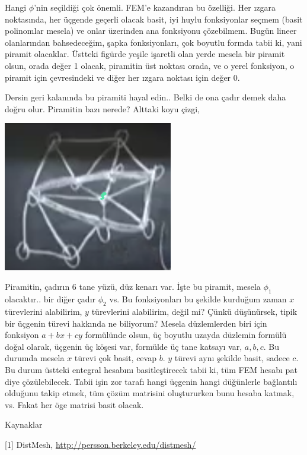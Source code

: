 \documentclass[12pt,fleqn]{article}\usepackage{../../common}
\begin{document}
Hangi $\phi$'nin seçildiği çok önemli. FEM'e kazandıran bu özelliği. Her ızgara
noktasında, her üçgende geçerli olacak basit, iyi huylu fonksiyonlar seçmem
(basit polinomlar mesela) ve onlar üzerinden ana fonksiyonu çözebilmem.  Bugün
lineer olanlarından bahsedeceğim, şapka fonksiyonları, çok boyutlu formda tabii
ki, yani piramit olacaklar. Üstteki figürde yeşile işaretli olan yerde mesela
bir piramit olsun, orada değer 1 olacak, piramitin üst noktası orada, ve o yerel
fonksiyon, o piramit için çevresindeki ve diğer her ızgara noktası için değer 0.

Dersin geri kalanında bu piramiti hayal edin.. Belki de ona çadır demek daha
doğru olur. Piramitin bazı nerede? Alttaki koyu çizgi,

\includegraphics[width=20em]{compscieng_1_26_02.png}

Piramitin, çadırın 6 tane yüzü, düz kenarı var. İşte bu piramit, mesela $\phi_1$
olacaktır.. bir diğer çadır $\phi_2$ vs. Bu fonksiyonları bu şekilde kurduğum
zaman $x$ türevlerini alabilirim, $y$ türevlerini alabilirim, değil mi?
Çünkü düşünürsek, tipik bir üçgenin türevi hakkında ne biliyorum? Mesela
düzlemlerden biri için fonksiyon $a + bx + cy$ formülünde olsun, üç boyutlu
uzayda düzlemin formülü doğal olarak, üçgenin üç köşesi var, formülde üç tane
katsayı var, $a,b,c$. Bu durumda mesela $x$ türevi çok basit, cevap $b$. $y$
türevi aynı şekilde basit, sadece $c$. Bu durum üstteki entegral hesabını
basitleştirecek tabii ki, tüm FEM hesabı pat diye çözülebilecek. Tabii işin
zor tarafı hangi üçgenin hangi düğünlerle bağlantılı olduğunu takip etmek,
tüm çözüm matrisini oluştururken bunu hesaba katmak, vs. Fakat her öge
matrisi basit olacak. 

Kaynaklar

[1] DistMesh, \url{http://persson.berkeley.edu/distmesh/}
\end{document}
